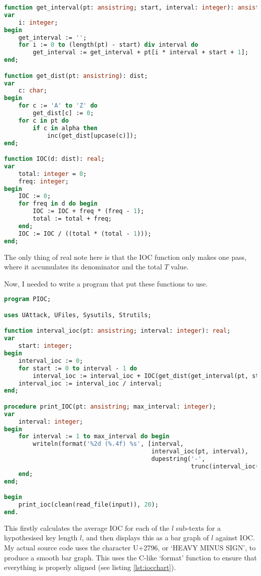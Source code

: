 \documentclass[fleqn,a4paper,11pt]{article}
\begin{document}
\begin{lstlisting}[language=Pascal, caption=The rest of the owl (IOC functions)]
function get_interval(pt: ansistring; start, interval: integer): ansistring;
var
    i: integer;
begin
    get_interval := '';
    for i := 0 to (length(pt) - start) div interval do
        get_interval := get_interval + pt[i * interval + start + 1];
end;

function get_dist(pt: ansistring): dist;
var
    c: char;
begin
    for c := 'A' to 'Z' do
        get_dist[c] := 0;
    for c in pt do
        if c in alpha then
            inc(get_dist[upcase(c)]);
end;

function IOC(d: dist): real;
var
    total: integer = 0;
    freq: integer;
begin
    IOC := 0;
    for freq in d do begin
        IOC := IOC + freq * (freq - 1);
        total := total + freq;
    end;
    IOC := IOC / ((total * (total - 1)));
end;
\end{lstlisting}

    The only thing of real note here is that the IOC function only makes one
    pass, where it accumulates its denominator and the total \(T\) value.

    Now, I needed to write a program that put these functions to use.

\begin{lstlisting}[language=Pascal, caption=Command-line interface to IOC functions (PIOC.pas)]
program PIOC;

uses UAttack, UFiles, Sysutils, Strutils;

function interval_ioc(pt: ansistring; interval: integer): real;
var
    start: integer;
begin
    interval_ioc := 0;
    for start := 0 to interval - 1 do
        interval_ioc := interval_ioc + IOC(get_dist(get_interval(pt, start, interval)));
    interval_ioc := interval_ioc / interval;
end;

procedure print_IOC(pt: ansistring; max_interval: integer);
var
    interval: integer;
begin
    for interval := 1 to max_interval do begin
        writeln(format('%2d (%.4f) %s', [interval,
                                         interval_ioc(pt, interval),
                                         dupestring('-',
                                                    trunc(interval_ioc(pt, interval) * 500))]));
    end;
end;

begin
    print_ioc(clean(read_file(input)), 20);
end.
\end{lstlisting}

    This firstly calculates the average IOC for each of the \(l\) sub-texts for a
    hypothesised key length \(l\), and then displays this as a bar graph of
    \(l\)
    against IOC. My actual source code uses the character U+2796, or `HEAVY
    MINUS SIGN', to produce a smooth bar graph. This uses the C-like `format'
    function to ensure that everything is properly aligned (see listing
    \ref{lst:iocchart}).
\end{document}
